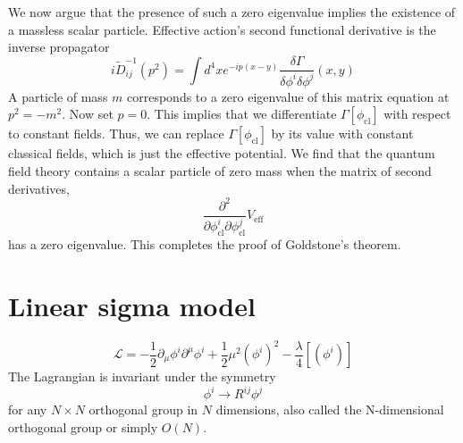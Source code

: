 We now argue that the presence of such a zero eigenvalue implies the existence of a massless scalar particle. Effective action's second functional derivative is the inverse propagator
\[i\tilde{D}_{ij}^{-1}(p^2) = \int d^4x e^{-ip(x-y)} \frac{\delta \Gamma}{\delta \phi^i \delta \phi^j}(x,y)\]
A particle of mass $m$ corresponds to a zero eigenvalue of this matrix equation at $p^2 = - m^2$. Now set $p=0$. This implies that we differentiate $\Gamma[\phi_{\mathrm{cl}}]$ with respect to constant fields. Thus, we can replace $\Gamma[\phi_{\mathrm{cl}}]$ by its value with constant
classical fields, which is just the effective potential. We find that the quantum field theory contains a scalar particle of zero mass when the matrix of second derivatives,
\[\frac{\partial^2}{\partial \phi^i_{\mathrm{cl}} \partial \phi^j_{\mathrm{cl}}}V_{\mathrm{eff}}\]
has a zero eigenvalue. This completes the proof of Goldstone's theorem. 

\section{Linear sigma model}
\[\mathcal{L} = -\frac{1}{2} \partial_{\mu} \phi^i \partial^{\mu}\phi^i + \frac{1}{2} \mu^2 (\phi^i)^2 - \frac{\lambda}{4} [(\phi^i)]\]
The Lagrangian is invariant under the symmetry
\[\phi^i \to R^{ij} \phi^j\]
for any $N \times N$ orthogonal group in $N$ dimensions, also called the N-dimensional orthogonal group or simply $O(N)$.

